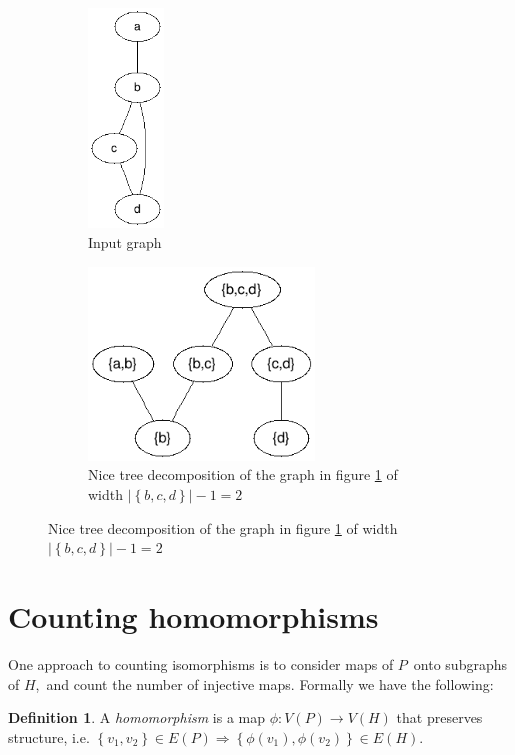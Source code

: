 \documentclass[a4paper,11pt]{report}
\theoremstyle{plain}
\theoremstyle{definition}
\newtheorem{defn}[thm]{Definition} %
\begin{document}
\begin{figure}[here]
\centering
\begin{subfigure}[b]{\linewidth}
\centering
\includegraphics[width=2cm]{images/input_graph.png} 
\caption[Graph]{Input graph}
\label{fig:arbitrary-graph}
\end{subfigure}
\begin{subfigure}[b]{\linewidth}
\centering
\includegraphics[width=6cm]{images/nice_tree_decomp.png} 
\caption[Decomposition]{Nice tree decomposition of the graph in figure \ref{fig:arbitrary-graph} of width $|\left\{b, c, d\right\}| - 1 = 2$}
\label{fig:decomp-graph}
\end{subfigure}
\end{figure}

\section{Counting homomorphisms}
\label{section:injhomo}
One approach to counting isomorphisms is to consider maps of $P$ onto subgraphs of $H$, and count the number of injective maps.
Formally we have the following:

\begin{defn}
A \emph{homomorphism} is a map $\phi : V(P) \rightarrow V(H)$ that preserves structure,
i.e. $\left\{v_1, v_2\right\} \in E(P) \Rightarrow \left\{\phi(v_1), \phi(v_2)\right\} \in E(H)$.
\end{defn}
\end{document}
